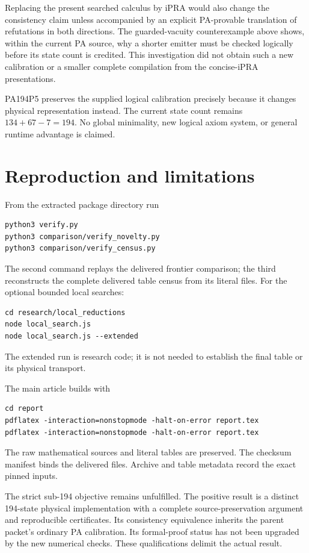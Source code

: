 \documentclass[11pt,letterpaper]{article}
\begin{document}
Replacing the present searched calculus by iPRA would also change the
consistency claim unless accompanied by an explicit PA-provable translation
of refutations in both directions. The guarded-vacuity counterexample above
shows, within the current PA source, why a shorter emitter must be checked
logically before its state count is credited. This investigation did not
obtain such a new calibration or a smaller complete compilation from the
concise-iPRA presentations.

PA194P5 preserves the supplied logical calibration precisely
because it changes physical representation instead. The current
state count remains $134+67-7=194$. No global minimality, new
logical axiom system, or general runtime advantage is claimed.

\section{Reproduction and limitations}

From the extracted package directory run
\begin{verbatim}
python3 verify.py
python3 comparison/verify_novelty.py
python3 comparison/verify_census.py
\end{verbatim}
The second command replays the delivered frontier comparison; the third
reconstructs the complete delivered table census from its literal files.
For the optional bounded local searches:
\begin{verbatim}
cd research/local_reductions
node local_search.js
node local_search.js --extended
\end{verbatim}
The extended run is research code; it is not needed to establish
the final table or its physical transport.

The main article builds with
\begin{verbatim}
cd report
pdflatex -interaction=nonstopmode -halt-on-error report.tex
pdflatex -interaction=nonstopmode -halt-on-error report.tex
\end{verbatim}
The raw mathematical sources and literal tables are preserved.
The checksum manifest binds the delivered files. Archive and
table metadata record the exact pinned inputs.

The strict sub-194 objective remains unfulfilled. The positive
result is a distinct 194-state physical implementation with
a complete source-preservation argument and reproducible
certificates. Its consistency equivalence inherits the
parent packet's ordinary PA calibration. Its formal-proof
status has not been upgraded by the new numerical checks.
These qualifications delimit the actual result.
\end{document}
